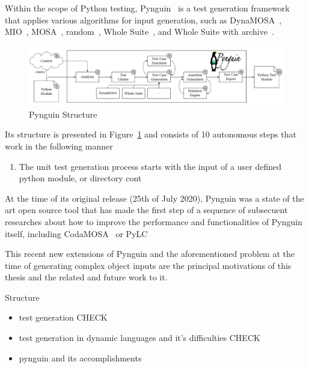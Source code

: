 \documentclass[%
  chapterprefix=false,%
  open=right,%
  twoside=true,%
  paper=a4,%
  logofile={Figures/logo.png},%
  thesistype=master,%
  UKenglish,%
]{se2thesis}
\begin{document}
Within the scope of Python testing, Pynguin~\cite{DBLP:conf/icse/LukasczykF22} is a test generation framework that applies various algorithms for input generation, such as DynaMOSA~\cite{DBLP:journals/tse/PanichellaKT18}, MIO~\cite{DBLP:conf/ssbse/Arcuri17}, MOSA~\cite{DBLP:conf/icst/PanichellaKT15}, random~\cite{DBLP:conf/icse/PachecoLEB07}, Whole Suite~\cite{DBLP:journals/tse/FraserA13}, and Whole Suite with archive~\cite{DBLP:journals/ese/RojasVAF17}.

\begin{figure}[tb]
  \centering
  \includegraphics[width=.99\textwidth]{Figures/pynguin.png}
  \caption{Pynguin Structure}\label{fig:pyn}
\end{figure}

Its structure is presented in Figure~\ref{fig:pyn} and consists of 10 autonomous steps that work in the following manner
\begin{enumerate}
  \item The unit test generation process starts with the input of a user defined python module, or directory cont
\end{enumerate}
At the time of its original release (25th of July 2020), Pynguin was a state of the art open source tool that has made the first step of a sequence of subsecuent researches about how to improve the performance and functionalities of Pynguin itself, including CodaMOSA~\cite{DBLP:conf/icse/LemieuxILS23} or PyLC~\cite{DBLP:conf/sac/SalariEAS23}

This recent new extensions of Pynguin and the aforementioned problem at the time of generating complex object inputs are the principal motivations of this thesis and the related and future work to it.

\iffalse{}
\begin{summary}{Structure}
\begin{itemize}
  \item test generation CHECK
  \item test generation in dynamic languages and it's difficulties CHECK
  \item pynguin and its accomplishments
\end{itemize}
\end{summary}
\end{document}
